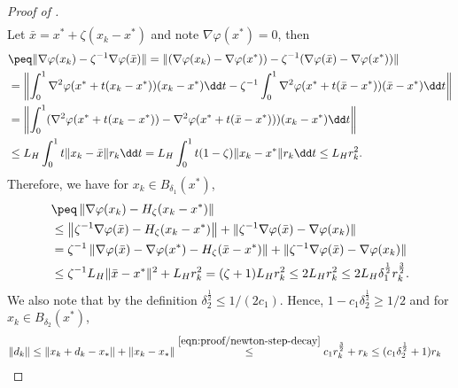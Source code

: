 \begin{proof}[Proof of ]
\begin{align}
    \end{align}
    Let $\bar x = x^* + \zeta(x_k - x^*)$ and note $\nabla \varphi(x^*) = 0$, then
    \begin{align*}
        &\peq \| \nabla \varphi(x_k) - \zeta^{-1} \nabla \varphi(\bar x) \|
        = \| (\nabla \varphi(x_k) - \nabla\varphi(x^*)) - \zeta^{-1} (\nabla \varphi(\bar x) - \nabla \varphi(x^*)) \| \\
        &= \left \| \int_0^1 \nabla^2\varphi(x^* + t(x_k - x^*)) (x_k - x^*) \dd t
        - \zeta^{-1} \int_0^1 \nabla^2\varphi(x^* + t(\bar x  - x^*)) (\bar x - x^*) \dd t \right \| \\
        &= \left \| \int_0^1 (\nabla^2\varphi(x^* + t(x_k - x^*)) - \nabla^2\varphi(x^* + t(\bar x - x^*))) (x_k - x^*) \dd t \right \| \\
        &\leq L_H \int_0^1 t \| x_k - \bar x \| r_k \dd t 
        = L_H \int_0^1 t (1 - \zeta) \| x_k - x^* \| r_k \dd t 
        \leq L_H r_k^2.
    \end{align*}
    Therefore, we have for $x_k \in B_{\delta_1}(x^*)$,
    \begin{align}
        \nonumber
        &\peq \left \|  
          \nabla \varphi(x_k) - H_\zeta(x_k - x^*)
        \right \| \\ 
        \nonumber
        &\leq  
        \left \|  
          \zeta^{-1}\nabla \varphi(\bar x) - H_\zeta(x_k - x^*)
        \right \| + \| \zeta^{-1} \nabla \varphi(\bar x) - \nabla \varphi(x_k) \| \\
        \nonumber
        & = 
        \zeta^{-1}\left \|  
          \nabla \varphi(\bar x) - \nabla\varphi(x^*) - H_\zeta(\bar x - x^*)
        \right \| + \| \zeta^{-1} \nabla \varphi(\bar x) - \nabla \varphi(x_k) \| \\
        \label{eqn:appendix/proof-newton-step-intermediate-1}
        &\leq \zeta^{-1} L_H \| \bar x - x^* \|^2
        + L_H r_k^2
        = (\zeta + 1)L_H r_k^2
        \leq 2L_H r_k^2
        \leq 2L_H \delta_1^{\frac{1}{2}} r_k^{\frac{3}{2}}.
    \end{align}
    We also note that by the definition $\delta_2^{\frac{1}{2}} \leq 1 / (2c_1)$.
    Hence, $1 - c_1 \delta_2^{\frac{1}{2}} \geq 1/2$ and for $x_k \in B_{\delta_2}(x^*)$, 
    \begin{align}
        \label{eqn:inexact-descent-direction-upper-bound}
        \| d_k \| &\leq \| x_k + d_k - x_* \| + \| x_k - x_* \| 
        \overset{\eqref{eqn:proof/newton-step-decay}}{\leq} 
        c_1 r_k^{\frac{3}{2}} +  r_k
        \leq (c_1\delta_2^{\frac{1}{2}} + 1) r_k 

\end{align}
\end{proof}
